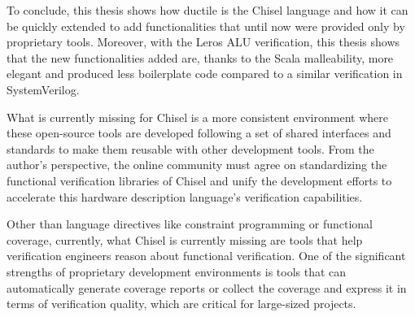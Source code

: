 To conclude, this thesis shows how ductile is the Chisel language and how it can
be quickly extended to add functionalities that until now were provided only by
proprietary tools. Moreover, with the Leros ALU verification, this thesis shows
that the new functionalities added are, thanks to the Scala malleability, more
elegant and produced less boilerplate code compared to a similar verification in
SystemVerilog.

What is currently missing for Chisel is a more consistent environment where
these open-source tools are developed following a set of shared interfaces and
standards to make them reusable with other development tools. From the author's
perspective, the online community must agree on standardizing the functional
verification libraries of Chisel and unify the development efforts to accelerate
this hardware description language's verification capabilities.

Other than language directives like constraint programming or functional
coverage, currently, what Chisel is currently missing are tools that help
verification engineers reason about functional verification. One of the
significant strengths of proprietary development environments is tools that can
automatically generate coverage reports or collect the coverage and express it
in terms of verification quality, which are critical for large-sized projects.
